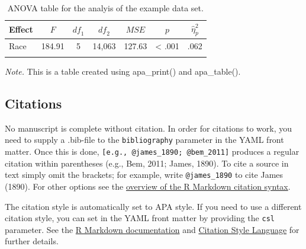 \documentclass[
  english,
  man]{apa6}
\begin{document}
\begin{table}[tbp]

\begin{center}
\begin{threeparttable}

\caption{\label{tab:anova-table}ANOVA table for the analyis of the example data set.}

\begin{tabular}{lrcrrrl}
\toprule
Effect & \multicolumn{1}{c}{$F$} & \multicolumn{1}{c}{$\mathit{df}_1$} & \multicolumn{1}{c}{$\mathit{df}_2$} & \multicolumn{1}{c}{$\mathit{MSE}$} & \multicolumn{1}{c}{$p$} & \multicolumn{1}{c}{$\hat{\eta}^2_p$}\\
\midrule
Race & 184.91 & 5 & 14,063 & 127.63 & < .001 & .062\\
\bottomrule
\addlinespace
\end{tabular}

\begin{tablenotes}[para]
\normalsize{\textit{Note.} This is a table created using apa\_print() and apa\_table().}
\end{tablenotes}

\end{threeparttable}
\end{center}

\end{table}

\hypertarget{citations}{%
\subsection{Citations}\label{citations}}

No manuscript is complete without citation.
In order for citations to work, you need to supply a .bib-file to the \texttt{bibliography} parameter in the YAML front matter.
Once this is done, \texttt{{[}e.g.,\ @james\_1890;\ @bem\_2011{]}} produces a regular citation within parentheses (e.g., Bem, 2011; James, 1890).
To cite a source in text simply omit the brackets; for example, write \texttt{@james\_1890} to cite James (1890).
For other options see the \href{http://rmarkdown.rstudio.com/authoring_bibliographies_and_citations.html}{overview of the R Markdown citation syntax}.

The citation style is automatically set to APA style.
If you need to use a different citation style, you can set in the YAML front matter by providing the \texttt{csl} parameter.
See the \href{http://R\%20Markdown.rstudio.com/authoring_bibliographies_and_citations.html}{R Markdown documentation} and \href{http://citationstyles.org/}{Citation Style Language} for further details.
\end{document}
